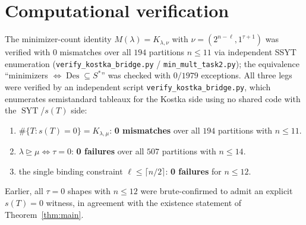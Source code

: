 \documentclass[11pt]{article}
\theoremstyle{remark}
\newcommand{\Des}{\operatorname{Des}}
\newcommand{\SYT}{\operatorname{SYT}}
\begin{document}
\section{Computational verification}

The minimizer-count identity $M(\lambda)=K_{\lambda,\nu}$ with $\nu=(2^{n-\ell},1^{\tau+1})$ was verified with $0$ mismatches over all $194$ partitions $n\le 11$ via independent SSYT enumeration (\texttt{verify\_kostka\_bridge.py} / \texttt{min\_mult\_task2.py}); the equivalence ``minimizers $\iff\Des\subseteq S^{*}$'' was checked with $0/1979$ exceptions. All three legs were verified by an independent script \texttt{verify\_kostka\_bridge.py}, which enumerates semistandard tableaux for the Kostka side using no shared code with the $\SYT$/$s(T)$ side:
\begin{enumerate}
\item[(i)] $\#\{T:s(T)=0\}=K_{\lambda,\mu}$: \textbf{0 mismatches} over all $194$ partitions with $n\le 11$.
\item[(ii)] $\lambda\trianglerighteq\mu \iff \tau=0$: \textbf{0 failures} over all $507$ partitions with $n\le 14$.
\item[(iii)] the single binding constraint $\ell\le\lceil n/2\rceil$: \textbf{0 failures} for $n\le 12$.
\end{enumerate}
Earlier, all $\tau=0$ shapes with $n\le 12$ were brute-confirmed to admit an explicit $s(T)=0$ witness, in agreement with the existence statement of Theorem~\ref{thm:main}.
\end{document}
